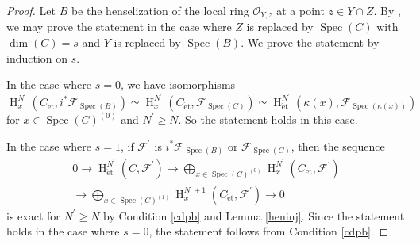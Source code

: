 \documentclass{article}
\newcommand{\spec}{\operatorname{Spec}}
\newcommand{\et}{\mathrm{\acute{e}t}}
\newcommand{\HO}{\operatorname{H}}
\begin{document}
%
\begin{proof}\upshape
Let $B$ be the henselization of the local ring
$\mathcal{O}_{Y, z}$ at a point $z\in Y\cap Z$.
By \cite[p.93, III, Corollary 1.28]{M}, we may prove the statement in the case where $Z$ is replaced
by $\spec(C)$ with $\operatorname{dim}(C)=s$
and $Y$ is replaced by $\spec(B)$.
We prove the statement by induction on $s$. 

In the case where $s=0$, we have isomorphisms
%
\begin{equation*}
\HO^{N^{\prime}}_{x}(
C_{\et},
i^{*}\mathcal{F}_{\spec(B)}
)
\simeq 
\HO^{N^{\prime}}_{x}(
C_{\et},
\mathcal{F}_{\spec(C)}
)
\simeq 
\HO^{N^{\prime}}_{\et}(
\kappa(x),
\mathcal{F}_{\spec(\kappa(x))}
)
\end{equation*}
%
for $x\in \spec(C)^{(0)}$ and $N^{\prime}\geq N$. 
So the statement holds in this case.

In the case where $s=1$, 
if $\mathcal{F}^{\prime}$ is $i^{*}\mathcal{F}_{\spec(B)}$ or
$\mathcal{F}_{\spec(C)}$,
then the sequence
%
\begin{align*}
0\to 
\HO^{N^{\prime}}_{\et}(C, \mathcal{F}^{\prime})
\to 
\bigoplus_{x\in \spec(C)^{(0)}}
\HO^{N^{\prime}}_{x}(
C_{\et},
\mathcal{F}^{\prime}
)
\\
\to
\bigoplus_{x\in \spec(C)^{(1)}}
\HO^{N^{\prime}+1}_{x}(
C_{\et},
\mathcal{F}^{\prime}
)
\to 0
\end{align*}
%
is exact for $N^{\prime}\geq N$ 
by Condition \ref{cdpb} and Lemma \ref{heninj}. 
Since the statement holds in the case where 
$s=0$, 
the statement follows from Condition \ref{cdpb}. 


\end{proof}
\end{document}

